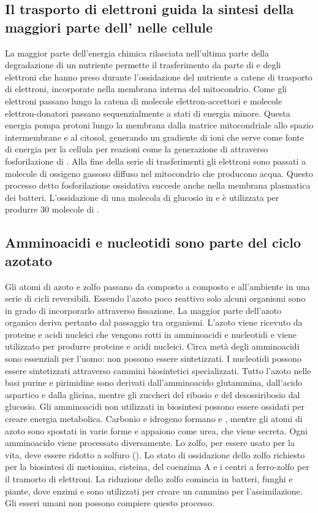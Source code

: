 \subsection{Il trasporto di elettroni guida la sintesi della maggiori parte dell' nelle cellule}
La maggior parte dell'energia chimica rilasciata nell'ultima parte della degradazione di un nutriente permette il trasferimento da parte di  e  degli elettroni che
hanno preso durante l'ossidazione del nutriente a catene di trasporto di elettroni, incorporate nella membrana interna del mitocondrio. Come gli elettroni passano lungo la catena di
molecole elettron-accettori e molecole elettron-donatori passano sequenzialmente a stati di energia minore. Questa energia pompa protoni  lungo la membrana dalla matrice 
mitocondriale allo spazio intermembrane e al citosol, generando un gradiente di ioni  che serve come fonte di energia per la cellula per reazioni come la generazione di 
attraverso fosforilazione di . Alla fine della serie di trasferimenti gli elettroni sono passati a molecole di ossigeno gassoso diffuso nel mitocondrio che producono acqua. 
Questo processo detto fosforilazione ossidativa succede anche nella membrana plasmatica dei batteri. L'ossidazione di una molecola di glucosio in  e  \`e utilizzata per
produrre $30$ molecole di .
\subsection{Amminoacidi e nucleotidi sono parte del ciclo azotato}
Gli atomi di azoto e zolfo passano da composto a composto e all'ambiente in una serie di cicli reversibili. Essendo l'azoto poco reattivo solo alcuni organismi sono in grado di 
incorporarlo attraverso fissazione. La maggior parte dell'azoto organico deriva pertanto dal passaggio tra organismi. L'azoto viene ricevuto da proteine e acidi nucleici che vengono
rotti in amminoacidi e nucleotidi e viene utilizzato per produrre proteine e acidi nucleici. Circa met\`a degli amminoacidi sono essenziali per l'uomo: non possono essere sintetizzati. 
I nucleotidi possono essere sintetizzati attraverso cammini biosintetici specializzati. Tutto l'azoto nelle basi purine e pirimidine sono derivati dall'amminoacido glutammina, dall'acido
aspartico e dalla glicina, mentre gli zuccheri del ribosio e del desossiribosio dal glucosio. Gli amminoacidi non utilizzati in biosintesi possono essere ossidati per creare energia
metabolica. Carbonio e idrogeno formano  e , mentre gli atomi di azoto sono spostati in varie forme e appaiono come urea, che viene secreta. Ogni amminoacido viene
processato diversamente. Lo zolfo, per essere usato per la vita, deve essere ridotto a solfuro (). Lo stato di ossidazione dello zolfo richiesto per la biosintesi di 
metionina, cisteina, del coenzima A e i centri a ferro-zolfo per il tramorto di elettroni. La riduzione dello zolfo comincia in batteri, funghi e piante, dove enzimi e  sono 
utilizzati per creare un cammino per l'assimilazione. Gli esseri umani non possono compiere questo processo.
